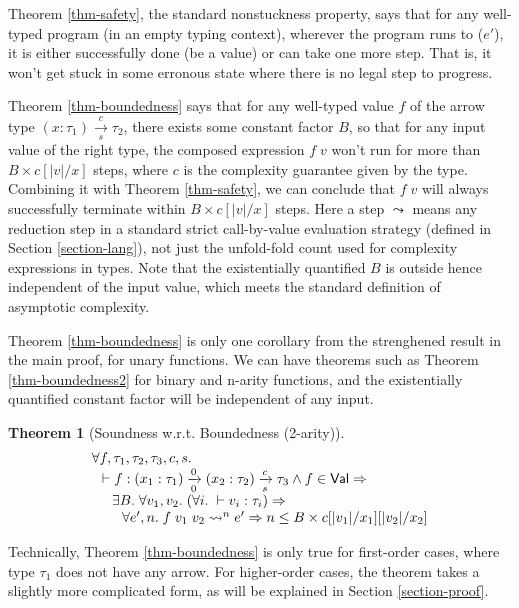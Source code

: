 \documentclass[preprint]{sigplanconf}
\newcommand{\arrow}[4]{#1\xrightarrow[#3]{#2}#4}
\newtheorem{thm}{Theorem}
\begin{document}
Theorem \ref{thm-safety}, the standard nonstuckness property, says that for any well-typed program (in an empty typing context), wherever the program runs to ($e'$), it is either successfully done (be a value) or can take one more step. That is, it won't get stuck in some erronous state where there is no legal step to progress.

Theorem \ref{thm-boundedness} says that for any well-typed value $f$ of the arrow type $\arrow{(x:\tau_1)}{c}{s}{\tau_2}$, there exists some constant factor $B$, so that for any input value of the right type, the composed expression $f\;v$ won't run for more than $B\times c[|v|/x]$ steps, where $c$ is the complexity guarantee given by the type. Combining it with Theorem \ref{thm-safety}, we can conclude that $f\;v$ will always successfully terminate within $B\times c[|v|/x]$ steps. Here a step $\leadsto$ means any reduction step in a standard strict call-by-value evaluation strategy (defined in Section \ref{section-lang}), not just the unfold-fold count used for complexity expressions in types. Note that the existentially quantified $B$ is outside hence independent of the input value, which meets the standard definition of asymptotic complexity. 

Theorem \ref{thm-boundedness} is only one corollary from the strenghened result in the main proof, for unary functions. We can have theorems such as Theorem \ref{thm-boundedness2} for binary and n-arity functions, and the existentially quantified constant factor will be independent of any input.

\begin{thm}[\label{thm-boundedness2}Soundness w.r.t. Boundedness (2-arity)]
$$
\begin{array}{l}
\forall f,\tau_1,\tau_2,\tau_3,c,s. \\
\hspace{0.1in} \vdash f:\arrow{(x_1:\tau_1)}{0}{0}{\arrow{(x_2:\tau_2)}{c}{s}{\tau_3}} \wedge f\in\mathsf{Val}\Rightarrow \\
\hspace{0.2in} \exists B. \;\forall v_1,v_2.\; (\forall i.\;\vdash v_i:\tau_i) \Rightarrow \\
\hspace{0.3in} \forall e',n.\; f\;v_1\;v_2\leadsto^n e' \Rightarrow n\leq B\times c[|v_1|/x_1][|v_2|/x_2]
\end{array}
$$
\end{thm}

Technically, Theorem \ref{thm-boundedness} is only true for first-order cases, where type $\tau_1$ does not have any arrow. For higher-order cases, the theorem takes a slightly more complicated form, as will be explained in Section \ref{section-proof}.
\end{document}
